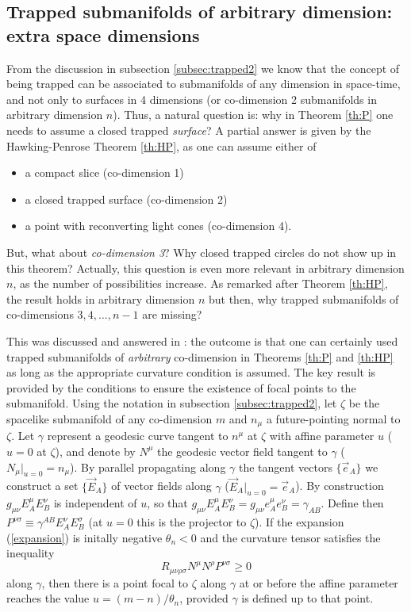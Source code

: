 \documentclass[12pt]{iopart}
\def\be{\begin{equation}}
\def\ee{\end{equation}}
\begin{document}
\subsection{Trapped submanifolds of arbitrary dimension: extra space dimensions}
From the discussion in subsection \ref{subsec:trapped2} we know that the concept of being trapped can be associated to submanifolds of any dimension in space-time, and not only to surfaces in 4 dimensions (or co-dimension 2 submanifolds in arbitrary dimension $n$). Thus, a natural question is: why in Theorem \ref{th:P} one needs to assume a closed trapped {\em surface}? A partial answer is given by the Hawking-Penrose Theorem \ref{th:HP}, as one can assume either of
\begin{itemize}
\item a compact slice (co-dimension 1)
\item a closed trapped surface (co-dimension 2)
\item a point with reconverting light cones (co-dimension 4). 
\end{itemize}
But, what about {\em co-dimension 3}? Why closed trapped circles do not show up in this theorem? Actually, this question is even more relevant in arbitrary dimension $n$, as the number of possibilities increase. As remarked after Theorem \ref{th:HP}, the result holds in arbitrary dimension $n$ but then, why trapped submanifolds of co-dimensions $3,4,\dots ,n-1$ are missing?

This was discussed and answered in  \cite{GaS}: the outcome is that one can certainly used trapped submanifolds of {\em arbitrary} co-dimension in Theorems \ref{th:P} and \ref{th:HP} as long as the appropriate curvature condition is assumed. The key result is provided by the conditions to ensure the existence of focal points to the submanifold. Using the notation in subsection \ref{subsec:trapped2}, let $\zeta$ be the spacelike submanifold of any co-dimension $m$ and $n_{\mu}$ a future-pointing normal to $\zeta$. Let $\gamma$ represent a geodesic curve tangent to $n^\mu$ at $\zeta$ with affine parameter $u$ ($u=0$ at $\zeta$), and denote by $N^{\mu}$ the geodesic vector field tangent to $\gamma$ ($N_{\mu}|_{u=0}=n_{\mu}$).
By parallel propagating along $\gamma$ the tangent vectors $\{\vec{e}_{A}\}$ we construct a set
$\{\vec E_{A}\}$ of vector fields along $\gamma$ ($\vec{E}_{A}|_{u=0}=\vec{e}_{A}$). By construction $g_{\mu\nu}E^\mu_{A}E^\nu_{B}$ is independent of $u$, so that $g_{\mu\nu}E^\mu_{A}E^\nu_{B}=g_{\mu\nu}e^\mu_{A}e^\nu_{B}=\gamma_{AB}$. Define then $P^{\nu\sigma}\equiv \gamma^{AB}E^\nu_{A}E^\sigma_{B}$ (at $u=0$ this is the projector to $\zeta$). If the expansion (\ref{expansion}) is initally negative  $\theta_n <0$ and the curvature tensor satisfies the inequality
\be
R_{\mu\nu\rho\sigma}N^\mu N^\rho P^{\nu\sigma}\geq 0 \label{cond}
\ee
along $\gamma$, then there is a point focal to $\zeta$ along $\gamma$ at or before the affine parameter reaches the value $u=(m-n)/\theta_n$, provided $\gamma$ is defined up to that point.
\end{document}
